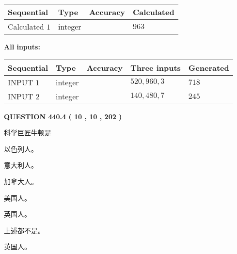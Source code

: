 \documentclass{ctexart}
\begin{document}
   
   
   
\noindent{}
   
   
  
  
\noindent\begin{tabular}{|l|l|l|l|}
\hline
 Sequential & Type & Accuracy & Calculated \\ 
\hline
 
 
  Calculated $  1 $ & integer &  & 
  $ 963 $ 
 \\  \hline  
 \end{tabular}
   
   
   
   
\noindent\vspace{0.1in}\hspace{-0.08in} {\textbf{\Large{All inputs: }}}
   
   
  
  
\noindent\begin{tabular}{|l|l|l|l|l|}
\hline
 Sequential & Type & Accuracy & Three inputs & Generated \\ 
\hline
 
 
  INPUT $  1 $ & integer &  & $
 520
 , 
 960
 , 
 3
 $ & $ 718 $ 
 \\  \hline  
 
 
  INPUT $  2 $ & integer &  & $
 140
 , 
 480
 , 
 7
 $ & $ 245 $ 
 \\  \hline  
 \end{tabular}
   
   
  
\vspace{0.2in}
  
{\textbf{\Large{QUESTION
440.4 
 ( 10 , 10 , 202 )
}}}
  
  
科学巨匠牛顿是
 
 
以色列人。
 
 
意大利人。
 
 
加拿大人。
 
 
美国人。
 
 
英国人。
 
 
 上述都不是。
 
 
\noindent{}
 
 
英国人。
 
\end{document}

